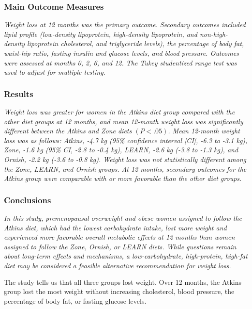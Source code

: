\documentclass[11pt, chapterprefix=true]{scrbook}\usepackage[]{graphicx}\usepackage[]{color}
\begin{document}
\subsubsection{Main Outcome Measures}

\textit{Weight loss at 12 months was the primary outcome.  Secondary outcomes included lipid profile (low-density lipoprotein, high-density lipoprotein, and non-high-density lipoprotein cholesterol, and triglyceride levels), the percentage of body fat, waist-hip ratio, fasting insulin and glucose levels, and blood pressure. Outcomes were assessed at months 0, 2, 6, and 12. The Tukey studentized range test was used to adjust for multiple testing.}

\subsubsection{Results}

\textit{Weight loss was greater for women in the Atkins diet group compared with the other diet groups at 12 months, and mean 12-month weight loss was significantly different between the Atkins and Zone diets $(P<.05)$. Mean 12-month weight loss was as follows: Atkins, -4.7 kg (95\% confidence interval [CI], -6.3 to -3.1 kg), Zone, -1.6 kg (95\% CI, -2.8 to -0.4 kg), LEARN, -2.6 kg (-3.8 to -1.3 kg), and Ornish, -2.2 kg (-3.6 to -0.8 kg). Weight loss was not statistically different among the Zone, LEARN, and Ornish groups. At 12 months, secondary outcomes for the Atkins group were comparable with or more favorable than the other diet groups.}

\subsubsection{Conclusions}

\textit{In this study, premenopausal overweight and obese women assigned to follow the Atkins diet, which had the lowest carbohydrate intake, lost more weight and experienced more favorable overall metabolic effects at 12 months than women assigned to follow the Zone, Ornish, or LEARN diets. While questions remain about long-term effects and mechanisms, a low-carbohydrate, high-protein, high-fat diet may be considered a feasible alternative recommendation for weight loss.}

The study tells us that all three groups lost weight.  Over 12 months, the Atkins group lost the most weight without increasing cholesterol, blood pressure, the percentage of body fat, or fasting glucose levels.
\end{document}
